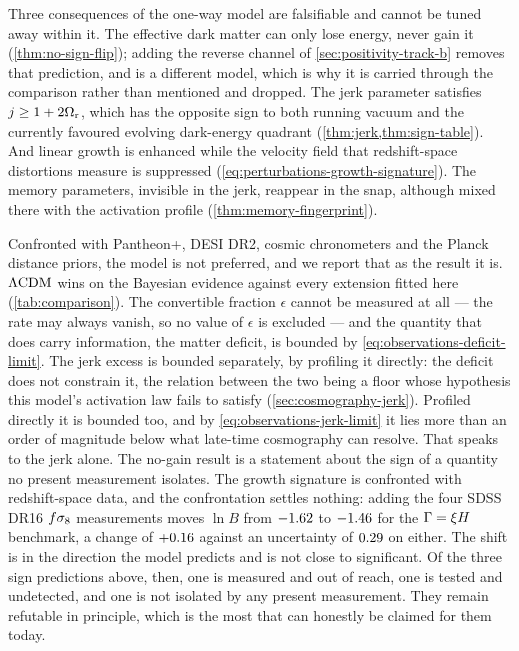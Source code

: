 Three consequences of the one-way model are falsifiable and cannot be tuned
away within it. The effective dark matter can only lose energy, never gain it
(\cref{thm:no-sign-flip}); adding the reverse channel of
\cref{sec:positivity-track-b} removes that prediction, and is a different
model, which is why it is carried through the comparison rather than mentioned
and dropped. The jerk
parameter satisfies $j\ge1+2\Omega_{\mathrm{r}}$, which has the opposite sign to both
running vacuum and the currently favoured evolving dark-energy quadrant
(\cref{thm:jerk,thm:sign-table}). And linear growth is enhanced while the
velocity field that redshift-space distortions measure is suppressed
(\cref{eq:perturbations-growth-signature}). The memory parameters, invisible in
the jerk, reappear in the snap, although mixed there with the activation
profile (\cref{thm:memory-fingerprint}).

Confronted with Pantheon+, DESI DR2, cosmic chronometers and the Planck
distance priors, the model is not preferred, and we report that as the result
it is. $\Lambda\mathrm{CDM}$ wins on the Bayesian evidence against every extension fitted
here (\cref{tab:comparison}). The convertible fraction $\epsilon$ cannot be
measured at all --- the rate may always vanish, so no value of $\epsilon$ is
excluded --- and the quantity that does carry information, the matter deficit,
is bounded by \cref{eq:observations-deficit-limit}. The jerk excess is bounded
separately, by profiling it directly: the deficit does not constrain it, the
relation between the two being a floor whose hypothesis this model's activation
law fails to satisfy (\cref{sec:cosmography-jerk}). Profiled directly it is bounded
too, and by \cref{eq:observations-jerk-limit} it lies more than an order of
magnitude below what late-time cosmography can resolve. That
speaks to the jerk alone. The no-gain result is a statement about the sign of a
quantity no present measurement isolates. The growth signature is confronted
with redshift-space data, and the confrontation settles nothing: adding the
four SDSS DR16 $f\sigma_{8}$ measurements moves $\ln B$ from
$-1.62$ to $-1.46$ for the
$\Gamma=\xi H$ benchmark, a change of $+0.16$ against an
uncertainty of $0.29$ on either. The shift is in the
direction the model predicts and is not close to significant. Of the three
sign predictions above, then, one is measured and out of reach, one is tested
and undetected, and one is not isolated by any present measurement. They remain refutable in principle, which is the most that
can honestly be claimed for them today.

